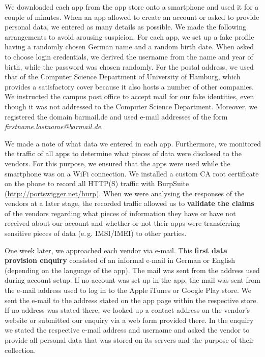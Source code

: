 \documentclass{llncs}
\begin{document}
We downloaded each app from the app store onto a smartphone and used it for a couple of minutes. When an app allowed to create an account or asked to provide personal data, we entered as many details as possible. We made the following arrangements to avoid arousing suspicion. For each app, we set up a fake profile having a randomly chosen German name and a random birth date. When asked to choose login credentials, we derived the username from the name and year of birth, while the password was chosen randomly. For the postal address, we used that of the Computer Science Department of University of Hamburg, which provides a satisfactory cover because it also hosts a number of other companies. We instructed the campus post office to accept mail for our fake identities, even though it was not addressed to the Computer Science Department. Moreover, we registered the domain barmail.de and used e-mail addresses of the form \emph{firstname.lastname@barmail.de}.

We made a note of what data we entered in each app. Furthermore, we monitored the traffic of all apps to determine what pieces of data were disclosed to the vendors. For this purpose, we ensured that the apps were used while the smartphone was on a WiFi connection. We installed a custom CA root certificate on the phone to record all HTTP(S) traffic with BurpSuite (\url{http://portswigger.net/burp}).
When we were analysing the responses of the vendors at a later stage, the recorded traffic allowed us to \textbf{validate the claims} of the vendors regarding what pieces of information they have or have not received about our account and whether or not their apps were transferring sensitive pieces of data (e.\,g. IMSI/IMEI) to other parties.

One week later, we approached each vendor via e-mail. This \textbf{first data provision enquiry} consisted of an informal e-mail in German or English (depending on the language of the app). The mail was sent from the address used during account setup. If no account was set up in the app, the mail was sent from the e-mail address used to log in to the Apple iTunes or Google Play store. We sent the e-mail to the address stated on the app page within the respective store. If no address was stated there, we looked up a contact address on the vendor's website or submitted our enquiry via a web form provided there. In the enquiry we stated the respective e-mail address and username and asked the vendor to provide all personal data that was stored on its servers and the purpose of their collection. 
\end{document}

